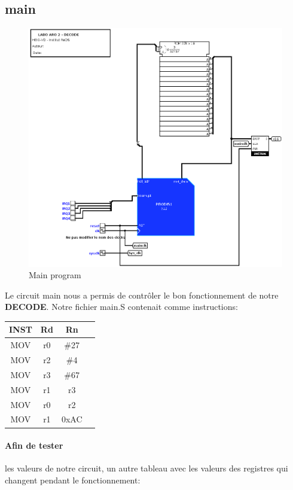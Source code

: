 \documentclass[a4paper]{article} %
\begin{document}
\subsection{main}
\begin{figure}[H]
    \centering
    \includegraphics[width=1\textwidth]{src/main.png}
    \caption{Main program}
    \label{main_img}
\end{figure}

Le circuit main nous a permis de contrôler le bon fonctionnement de notre \textbf{DECODE}. Notre fichier main.S contenait comme instructions:\\

\begin{tabular}{|c|c|c|c|}    
    \hline
    INST & Rd & Rn \\
    \hline
    MOV  & r0 & \#27    \\
    \hline
    MOV  & r2 & \#4    \\
    \hline
    MOV  & r3 & \#67    \\
    \hline
    MOV  & r1 & r3  \\
    \hline
    MOV  & r0 & r2 \\
    \hline
    MOV  & r1 & 0xAC    \\
    \hline
\end{tabular}

\paragraph{Afin de tester} les valeurs de notre circuit, un autre tableau avec les valeurs des registres qui changent pendant le fonctionnement:\\
\end{document}
